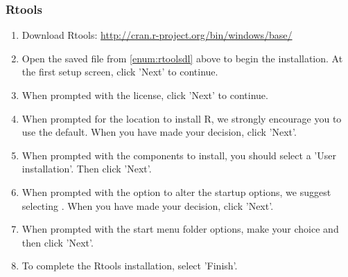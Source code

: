 \subsubsection{Rtools}

\begin{enumerate}
  \item Download Rtools: \url{http://cran.r-project.org/bin/windows/base/} \label{enum:rtoolsdl}
  \item Open the saved file from \ref{enum:rtoolsdl} above to begin the installation.  At the first setup screen, click 'Next' to continue.
  \item When prompted with the license, click 'Next' to continue.
  \item When prompted for the location to install R, we strongly encourage you to use the default.  When you have made your decision, click 'Next'.
  \item When prompted with the components to install, you should select a 'User installation'.  Then click 'Next'.
  \item When prompted with the option to alter the startup options, we suggest selecting .  When you have made your decision, click 'Next'.
  \item When prompted with the start menu folder options, make your choice and then click 'Next'.
  \item To complete the Rtools installation, select 'Finish'.
\end{enumerate}
